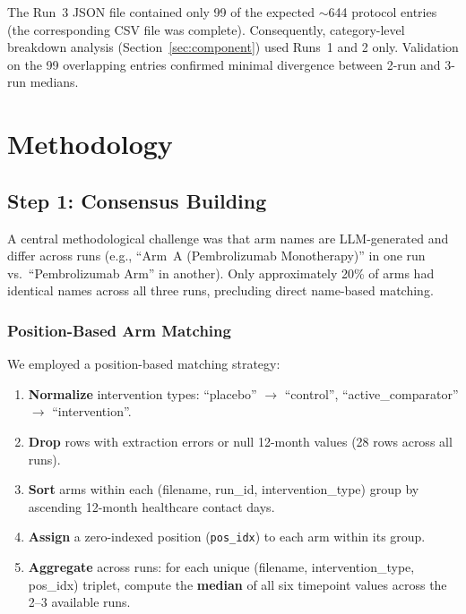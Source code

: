 \documentclass[11pt,a4paper]{article}
\begin{document}
The Run~3 JSON file contained only 99 of the expected $\sim$644 protocol entries (the corresponding CSV file was complete). Consequently, category-level breakdown analysis (Section~\ref{sec:component}) used Runs~1 and 2 only. Validation on the 99 overlapping entries confirmed minimal divergence between 2-run and 3-run medians.

\section{Methodology}

\subsection{Step 1: Consensus Building}
\label{sec:consensus}

A central methodological challenge was that arm names are LLM-generated and differ across runs (e.g., ``Arm~A (Pembrolizumab Monotherapy)'' in one run vs.\ ``Pembrolizumab Arm'' in another). Only approximately 20\% of arms had identical names across all three runs, precluding direct name-based matching.

\subsubsection{Position-Based Arm Matching}

We employed a position-based matching strategy:
\begin{enumerate}
    \item \textbf{Normalize} intervention types: ``placebo'' $\rightarrow$ ``control'', ``active\_comparator'' $\rightarrow$ ``intervention''.
    \item \textbf{Drop} rows with extraction errors or null 12-month values (28 rows across all runs).
    \item \textbf{Sort} arms within each (filename, run\_id, intervention\_type) group by ascending 12-month healthcare contact days.
    \item \textbf{Assign} a zero-indexed position (\texttt{pos\_idx}) to each arm within its group.
    \item \textbf{Aggregate} across runs: for each unique (filename, intervention\_type, pos\_idx) triplet, compute the \textbf{median} of all six timepoint values across the 2--3 available runs.
\end{enumerate}
\end{document}
